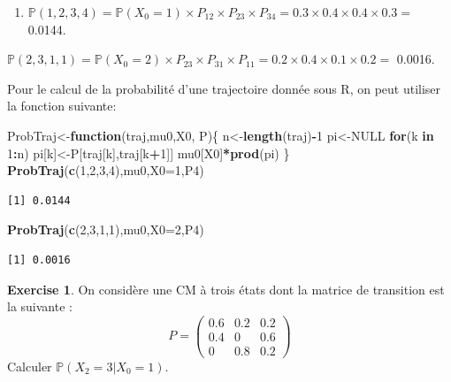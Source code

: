 \documentclass[
]{book}
\newenvironment{Shaded}{\begin{snugshade}}{\end{snugshade}}
\newcommand{\ControlFlowTok}[1]{\textcolor[rgb]{0.13,0.29,0.53}{\textbf{#1}}}
\newcommand{\DataTypeTok}[1]{\textcolor[rgb]{0.13,0.29,0.53}{#1}}
\newcommand{\DecValTok}[1]{\textcolor[rgb]{0.00,0.00,0.81}{#1}}
\newcommand{\KeywordTok}[1]{\textcolor[rgb]{0.13,0.29,0.53}{\textbf{#1}}}
\newcommand{\NormalTok}[1]{#1}
\newcommand{\OperatorTok}[1]{\textcolor[rgb]{0.81,0.36,0.00}{\textbf{#1}}}
\newcommand{\OtherTok}[1]{\textcolor[rgb]{0.56,0.35,0.01}{#1}}
\providecommand{\tightlist}{%
  \setlength{\itemsep}{0pt}\setlength{\parskip}{0pt}}
\theoremstyle{definition}
\theoremstyle{definition}
\theoremstyle{definition}
\newtheorem{exercise}{Exercise}[chapter]
\theoremstyle{remark}
\begin{document}
\begin{enumerate}
\def\labelenumi{\arabic{enumi}.}
\setcounter{enumi}{1}
\tightlist
\item
  \(\mathbb{P}(1,2,3,4)=\mathbb{P}(X_0=1)\times P_{12}\times P_{23}\times P_{34}= 0.3 \times 0.4 \times 0.4 \times 0.3 =\) 0.0144.
\end{enumerate}

\(\mathbb{P}(2,3,1,1)=\mathbb{P}(X_0=2)\times P_{23}\times P_{31}\times P_{11}= 0.2 \times 0.4 \times 0.1 \times 0.2 =\) 0.0016.

Pour le calcul de la probabilité d'une trajectoire donnée sous R, on peut utiliser la fonction suivante:

\begin{Shaded}
\begin{Highlighting}[]
\NormalTok{ProbTraj<-}\ControlFlowTok{function}\NormalTok{(traj,mu0,X0, P)\{}
\NormalTok{  n<-}\KeywordTok{length}\NormalTok{(traj)}\OperatorTok{-}\DecValTok{1}
\NormalTok{  pi<-}\OtherTok{NULL}
  \ControlFlowTok{for}\NormalTok{(k }\ControlFlowTok{in} \DecValTok{1}\OperatorTok{:}\NormalTok{n) pi[k]<-P[traj[k],traj[k}\OperatorTok{+}\DecValTok{1}\NormalTok{]]}
\NormalTok{mu0[X0]}\OperatorTok{*}\KeywordTok{prod}\NormalTok{(pi)}
\NormalTok{\}}
\KeywordTok{ProbTraj}\NormalTok{(}\KeywordTok{c}\NormalTok{(}\DecValTok{1}\NormalTok{,}\DecValTok{2}\NormalTok{,}\DecValTok{3}\NormalTok{,}\DecValTok{4}\NormalTok{),mu0,}\DataTypeTok{X0=}\DecValTok{1}\NormalTok{,P4)}
\end{Highlighting}
\end{Shaded}

\begin{verbatim}
[1] 0.0144
\end{verbatim}

\begin{Shaded}
\begin{Highlighting}[]
\KeywordTok{ProbTraj}\NormalTok{(}\KeywordTok{c}\NormalTok{(}\DecValTok{2}\NormalTok{,}\DecValTok{3}\NormalTok{,}\DecValTok{1}\NormalTok{,}\DecValTok{1}\NormalTok{),mu0,}\DataTypeTok{X0=}\DecValTok{2}\NormalTok{,P4)}
\end{Highlighting}
\end{Shaded}

\begin{verbatim}
[1] 0.0016
\end{verbatim}

\begin{exercise}
\protect\hypertarget{exr:unnamed-chunk-40}{}{\label{exr:unnamed-chunk-40} } On considère une CM à trois états dont la matrice de transition est la suivante :
\[ P=\left( 
  \begin{array}{ccc}
0.6 & 0.2 & 0.2 \\
0.4 & 0 & 0.6 \\
0 & 0.8 & 0.2
\end{array}
\right)\]
Calculer \(\mathbb{P}(X_2=3|X_0=1)\).
\end{exercise}
\end{document}
